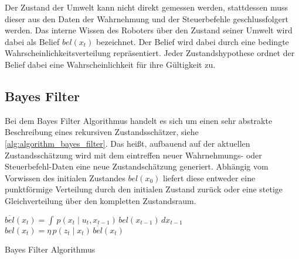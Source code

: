 Der Zustand der Umwelt kann nicht direkt gemessen werden, stattdessen muss dieser aus den Daten der Wahrnehmung und der Steuerbefehle geschlussfolgert werden. Das interne Wissen des Roboters über den Zustand seiner Umwelt wird dabei als Belief $bel(x_t)$ bezeichnet. Der Belief wird dabei durch eine bedingte Wahrscheinlichkeitsverteilung repräsentiert. Jeder Zustandshypothese ordnet der Belief dabei eine Wahrscheinlichkeit für ihre Gültigkeit zu.


%
%
\subsection{Bayes Filter}

Bei dem Bayes Filter Algorithmus handelt es sich um einen sehr abstrakte Beschreibung eines rekursiven Zustandsschätzer, siehe \autoref{alg:algorithm_bayes_filter}. Das heißt, aufbauend  auf der aktuellen Zustandsschätzung wird mit dem eintreffen neuer Wahrnehmungs- oder Steuerbefehl-Daten eine neue Zustandschätzung generiert. Abhängig vom Vorwissen des initialen Zustandes $bel(x_0)$ liefert diese entweder eine punktförmige Verteilung durch den initialen Zustand zurück oder eine stetige Gleichverteilung über den kompletten Zustandsraum. 


\begin{algorithm}
\begin{onehalfspacing}
	\DontPrintSemicolon
	{
		{
			$\overline{bel}(x_t) = \int \, p(x_t \mid u_t, x_{t-1}) \, bel(x_{t-1}) \, dx_{t-1}$\;
			$bel(x_t) = \eta \, p(z_t \mid x_t) \, \overline{bel}(x_t)$\;
		}
	}
\caption{Bayes Filter Algorithmus}
\label{alg:algorithm_bayes_filter}
\end{onehalfspacing}
\end{algorithm}

